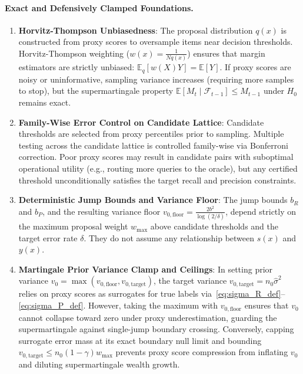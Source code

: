 \documentclass[11pt,a4paper]{article}
\begin{document}
\paragraph{Exact and Defensively Clamped Foundations.}
\begin{enumerate}[leftmargin=*]
    \item \textbf{Horvitz-Thompson Unbiasedness}: The proposal distribution $q(x)$ is constructed from proxy scores to oversample items near decision thresholds. Horvitz-Thompson weighting ($w(x) = \frac{1}{N q(x)}$) ensures that margin estimators are strictly unbiased: $\mathbb{E}_q[w(X) Y] = \mathbb{E}[Y]$. If proxy scores are noisy or uninformative, sampling variance increases (requiring more samples to stop), but the supermartingale property $\mathbb{E}[M_t \mid \mathcal{F}_{t-1}] \le M_{t-1}$ under $H_0$ remains exact.
    \item \textbf{Family-Wise Error Control on Candidate Lattice}: Candidate thresholds are selected from proxy percentiles prior to sampling. Multiple testing across the candidate lattice is controlled family-wise via Bonferroni correction. Poor proxy scores may result in candidate pairs with suboptimal operational utility (e.g., routing more queries to the oracle), but any certified threshold unconditionally satisfies the target recall and precision constraints.
    \item \textbf{Deterministic Jump Bounds and Variance Floor}: The jump bounds $b_R$ and $b_P$, and the resulting variance floor $v_{0, \text{floor}} = \frac{2 b^2}{\log(2/\delta)}$, depend strictly on the maximum proposal weight $w_{\max}$ above candidate thresholds and the target error rate $\delta$. They do not assume any relationship between $s(x)$ and $y(x)$.
    \item \textbf{Martingale Prior Variance Clamp and Ceilings}: In setting prior variance $v_0 = \max(v_{0, \text{floor}}, v_{0, \text{target}})$, the target variance $v_{0, \text{target}} = n_0 \hat{\sigma}^2$ relies on proxy scores as surrogates for true labels via~\eqref{eq:sigma_R_def}--\eqref{eq:sigma_P_def}. However, taking the maximum with $v_{0, \text{floor}}$ ensures that $v_0$ cannot collapse toward zero under proxy underestimation, guarding the supermartingale against single-jump boundary crossing. Conversely, capping surrogate error mass at its exact boundary null limit and bounding $v_{0, \text{target}} \le n_0 (1 - \gamma) w_{\max}$ prevents proxy score compression from inflating $v_0$ and diluting supermartingale wealth growth.
\end{enumerate}
\end{document}
